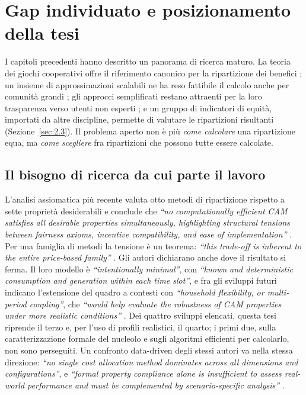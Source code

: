 \section{Gap individuato e posizionamento della tesi}
\label{sec:gaps}

I capitoli precedenti hanno descritto un panorama di ricerca maturo. La teoria dei giochi cooperativi offre il riferimento canonico per la ripartizione dei benefici \cite{shapley1953, moncecchi2020}; un insieme di approssimazioni scalabili ne ha reso fattibile il calcolo anche per comunità grandi \cite{castro2009, cremers2023, alonsopedrero2024, ferrucci2025}; gli approcci semplificati restano attraenti per la loro trasparenza verso utenti non esperti \cite{kulmala2021, fioriti2023}; e un gruppo di indicatori di equità, importati da altre discipline, permette di valutare le ripartizioni risultanti (Sezione~\ref{sec:2.3}). Il problema aperto non è più \emph{come calcolare} una ripartizione equa, ma \emph{come scegliere} fra ripartizioni che possono tutte essere calcolate.

\subsection*{Il bisogno di ricerca da cui parte il lavoro}

L'analisi assiomatica più recente valuta otto metodi di ripartizione rispetto a sette proprietà desiderabili e conclude che \textit{``no computationally efficient CAM satisfies all desirable properties simultaneously, highlighting structural tensions between fairness axioms, incentive compatibility, and ease of implementation''} \cite{gonzalezAsenjo2025}. Per una famiglia di metodi la tensione è un teorema: \textit{``this trade-off is inherent to the entire price-based family''} \cite{gonzalezAsenjo2025}. Gli autori dichiarano anche dove il risultato si ferma. Il loro modello è \textit{``intentionally minimal''}, con \textit{``known and deterministic consumption and generation within each time slot''}, e fra gli sviluppi futuri indicano l'estensione del quadro a contesti con \textit{``household flexibility, or multi-period coupling''}, che \textit{``would help evaluate the robustness of CAM properties under more realistic conditions''} \cite{gonzalezAsenjo2025}. Dei quattro sviluppi elencati, questa tesi riprende il terzo e, per l'uso di profili realistici, il quarto; i primi due, sulla caratterizzazione formale del nucleolo e sugli algoritmi efficienti per calcolarlo, non sono perseguiti. Un confronto data-driven degli stessi autori va nella stessa direzione: \textit{``no single cost allocation method dominates across all dimensions and configurations''}, e \textit{``formal property compliance alone is insufficient to assess real-world performance and must be complemented by scenario-specific analysis''} \cite{gonzalezAsenjo2026}.


